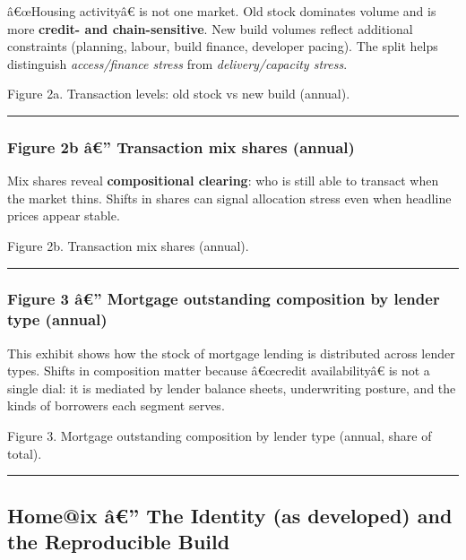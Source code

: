 â€œHousing activityâ€ is not one market. Old stock dominates volume and
is more \textbf{credit- and chain-sensitive}. New build volumes reflect
additional constraints (planning, labour, build finance, developer
pacing). The split helps distinguish \emph{access/finance stress} from
\emph{delivery/capacity stress}.

Figure 2a. Transaction levels: old stock vs new build (annual).

\begin{center}\rule{0.5\linewidth}{0.5pt}\end{center}

\protect{}\label{part1-fig2b}
\subsubsection{Figure 2b â€'' Transaction mix shares
(annual)}\label{figure-2b-uxe2-transaction-mix-shares-annual}

Mix shares reveal \textbf{compositional clearing}: who is still able to
transact when the market thins. Shifts in shares can signal allocation
stress even when headline prices appear stable.

Figure 2b. Transaction mix shares (annual).

\begin{center}\rule{0.5\linewidth}{0.5pt}\end{center}

\protect{}\label{part1-fig3}
\subsubsection{Figure 3 â€'' Mortgage outstanding composition by lender
type
(annual)}\label{figure-3-uxe2-mortgage-outstanding-composition-by-lender-type-annual}

This exhibit shows how the stock of mortgage lending is distributed
across lender types. Shifts in composition matter because â€œcredit
availabilityâ€ is not a single dial: it is mediated by lender balance
sheets, underwriting posture, and the kinds of borrowers each segment
serves.

Figure 3. Mortgage outstanding composition by lender type (annual, share
of total).

\begin{center}\rule{0.5\linewidth}{0.5pt}\end{center}

\protect{}\label{homeix-identity}
\subsection{Home@ix â€'' The Identity (as developed) and the
Reproducible
Build}\label{homeix-uxe2-the-identity-as-developed-and-the-reproducible-build}

